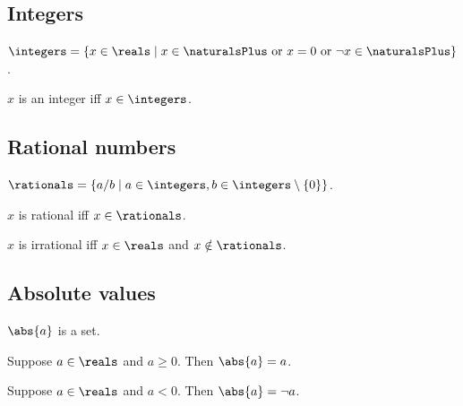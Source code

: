 \subsection{Integers}
 
\begin{definition}\label{real_integers}
  $\integers = \{x \in \reals \mid \text{$x \in \naturalsPlus$ or $x=0$ or $\neg{x} \in \naturalsPlus$}\}$.
\end{definition}

\begin{abbreviation}\label{real_integer}
    $x$ is an integer iff $x\in\integers$.
\end{abbreviation}

\subsection{Rational numbers}

\begin{definition}\label{real_rationals}
    $\rationals = \{ a / b \mid a\in\integers, b\in\integers\setminus\{0\}\}$.
\end{definition}

\begin{abbreviation}\label{real_rational}
    $x$ is rational iff $x\in\rationals$.
\end{abbreviation}

\begin{abbreviation}\label{real_irrational}
    $x$ is irrational iff $x\in\reals$ and $x\notin\rationals$.
\end{abbreviation}

\subsection{Absolute values}

\begin{signature} \label{sig8}
    $\abs{a}$ is a set.
\end{signature}

\begin{axiom}\label{real_abs_nonneg}
    Suppose $a\in\reals$ and $a \geq 0$.
    Then $\abs{a} = a$.
\end{axiom}

\begin{axiom}\label{real_abs_neg}
    Suppose $a\in\reals$ and $a < 0$.
    Then $\abs{a} = \neg{a}$.
\end{axiom}

